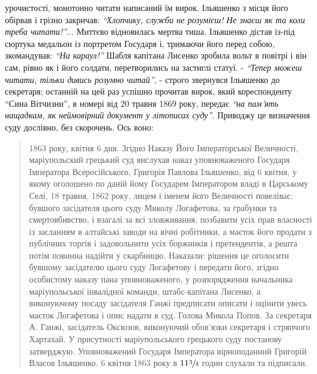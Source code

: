 \documentclass[a4paper,20pt]{report}
\begin{document}
урочистості, монотонно читати написаний їм вирок. Ільяшенко з місця його
обірвав і грізно закричав: \emph{``Хлопчику, служби не розумієш! Не знаєш як та
коли треба читати!''}...  Миттєво відновилась мертва тиша. Ільяшенко дістав
із-під сюртука медальон із портретом Государя і, тримаючи його перед собою,
зкомандував: \emph{``На караул!''} Шабля капітана Лисенко зробила вольт в повітрі і
він сам, рівно як і його солдати, перетворились на застиглі статуї. -
\emph{``Тепер можеш читати, тільки дивись розумно читай''}, - строго звернувся
Ільяшенко до секретаря; останній на цей раз успішно прочитав вирок, який
кореспонденту ``Сина Вітчизни'', в номері від 20 травня 1869 року, передає
\emph{``на пам'ять нащадкам, як неймовірний документ у літописах суду''}.
Приводжу це визначення суду дослівно, без скорочень. Ось воно:
\begin{quote}
\em\bfseries

1863 року, квітня 6 дня. Згідно Наказу Його Імператорської Величності,
маріупольский грецький суд вислухав наказ уповноваженого Государя
Імператора Всеросійського, Григорія Павлова Ільяшенко, від 6 квітня, у
якому оголошено по даній йому Государем Імператором владі в Царському
Селі, 18 травня, 1862 року, лицем і іменем його Величності повеліває:
бувшого засідателя цього суду Миколу Логафетова, за грабунки та
смертовбивство, і взагалі за всі зловживання, позбавити усіх прав
власності із засланням в алтайські заводи на вічні робітники, а маєток
його продати з публічних торгів і задовольнити усіх боржників і
претендентів, а решта потім повинна надійти у скарбницю. Наказали:
рішення це оголосити бувшому засідателю цього суду Логафетову і
передати його, згідно особистому наказу пана уповноваженого, у
розпорядження начальника маріупольської інвалідної команди,
штабс-капітана Лисенко, а виконуючому посаду засідателя Ганжі
предписати описати і оцінити увесь маєток Логафетова і опис надати в
суд. Голова Микола Попов. За секретаря А. Ганжі, засідатель Оксюзов,
виконуючий обов'язки секретаря і стряпчого Хартахай. У присутності
маріупольського грецького суду постанову затверджую. Уповноважений
Государя Імператора вірноподанний Григорій Власов Ільяшенко. 6 квітня
1863 року в $11 \sfrac{3}{4}$ годин слухали та підписали. 
\end{quote}
\end{document}
